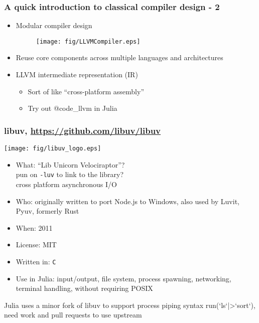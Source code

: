 \documentclass[compressed,dvips,letter]{beamer}
\begin{document}
\begin{frame}\frametitle{A quick introduction to classical compiler design - 2}
\begin{itemize}
\item Modular compiler design
\begin{figure}\texttt{[image: fig/LLVMCompiler.eps]}\end{figure}
\item Reuse core components across multiple languages and architectures
\item LLVM intermediate representation (IR)
\begin{itemize}
\item Sort of like ``cross-platform assembly''
\item Try out {\selectfont @code\_llvm} in Julia
\end{itemize}
\end{itemize}
\end{frame}

%
%

\begin{frame}\frametitle{libuv, \url{https://github.com/libuv/libuv}}
\vspace{10pt}
\begin{minipage}{0.35\textwidth}
\texttt{[image: fig/libuv\_logo.eps]}
\end{minipage} \begin{minipage}{0.62\textwidth}
\begin{itemize}
\item What: ``Lib Unicorn Velociraptor''? \\
pun on \texttt{-luv} to link to the library? \\
cross platform asynchronous I/O
\item Who: originally written to port Node.js to Windows, also used by Luvit, Pyuv, formerly Rust
\item When: 2011
\item License: MIT
\item Written in: \texttt{C}
\item Use in Julia: input/output, file system, process spawning, networking, terminal handling, without requiring POSIX
\end{itemize}
\end{minipage}

\vspace{15pt}
Julia uses a minor fork of libuv to support process piping syntax {\selectfont run(`ls`|>`sort`)}, need work and pull requests to use upstream

\end{frame}
\end{document}
